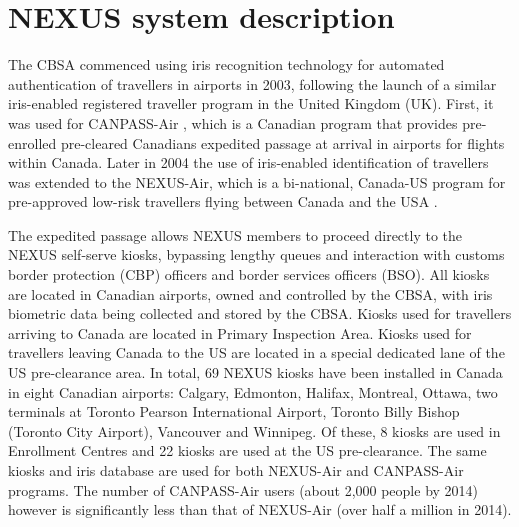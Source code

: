 \documentclass{cta-author}%
\begin{document}
\section{NEXUS system description}
\label{s.description}

The CBSA commenced using iris recognition technology for automated authentication of travellers in airports in 2003, following the launch of a similar iris-enabled registered traveller program in the United Kingdom (UK). First,   it was used for CANPASS-Air \cite{[kn:CANPASS]}, which is a Canadian program that provides pre-enrolled pre-cleared Canadians expedited passage at arrival in airports for flights within Canada. Later in 2004 the use of iris-enabled identification of travellers was extended to the NEXUS-Air, which is a bi-national, Canada-US program for pre-approved low-risk travellers flying between Canada and the USA \cite{[CBSA-NEXUS]}. 

The expedited passage allows NEXUS members to proceed directly to the NEXUS self-serve kiosks, bypassing lengthy queues and interaction with customs border protection (CBP) officers and border services officers (BSO). 
All kiosks are located in Canadian airports, owned and controlled by the CBSA, with iris biometric data being collected and stored by the CBSA. 
Kiosks used for travellers arriving to Canada are located in Primary Inspection Area.
Kiosks used for travellers leaving Canada to the US are located in a special dedicated lane of the US pre-clearance area. 
In total, 69 NEXUS kiosks have been installed in Canada in eight Canadian airports: Calgary, Edmonton, Halifax, Montreal, Ottawa, two terminals at Toronto Pearson International Airport, Toronto Billy Bishop (Toronto City Airport), Vancouver and Winnipeg. Of these, 8 kiosks are used in Enrollment Centres and 22 kiosks are used at the US pre-clearance.
The same kiosks and iris database are used for both NEXUS-Air and CANPASS-Air programs. 
The number of CANPASS-Air users (about 2,000 people by 2014) however is significantly less than that of NEXUS-Air (over half a million in 2014).


\end{document}
